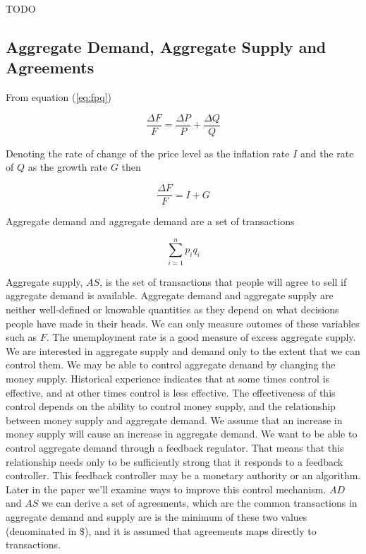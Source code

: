 TODO

\subsection{Aggregate Demand, Aggregate Supply and Agreements}

From equation (\ref{eq:fpq})

\[ \frac {\Delta F} F = \frac {\Delta P} P + \frac {\Delta Q} Q \]

Denoting the rate of change of the price level as the inflation rate $I$ and the rate of $Q$ as the
growth rate $G$ then

\begin{equation}
    \label{equation:fig}
    \frac {\Delta F} F = I + G
\end{equation}

Aggregate demand and aggregate demand are a set of transactions

\begin{equation}
    \sum_{i=1}^n p_i q_i
\end{equation}

Aggregate supply, $AS$, is the set of transactions that people will agree to sell if aggregate
demand is available. Aggregate demand and aggregate supply are neither well-defined or knowable
quantities as they depend on what decisions people have made in their heads. We can only measure
outomes of these variables such as $F$. The unemployment rate is a good measure of excess aggregate
supply. We are interested in aggregate supply and demand only to the extent that we can control
them. We may be able to control aggregate demand by changing the money supply. Historical experience
indicates that at some times control is effective, and at other times control is less effective. The
effectiveness of this control depends on the ability to control money supply, and the relationship
between money supply and aggregate demand. We assume that an increase in money supply will cause an
increase in aggregate demand. We want to be able to control aggregate demand through a feedback
regulator. That means that this relationship needs only to be sufficiently strong that it responds
to a feedback controller. This feedback controller may be a monetary authority or an algorithm.
Later in the paper we'll examine ways to improve this control mechanism. $AD$ and $AS$ we can derive
a set of agreements, which are the common transactions in aggregate demand and supply are is the
minimum of these two values (denominated in $\$$), and it is assumed that agreements maps directly
to transactions.

